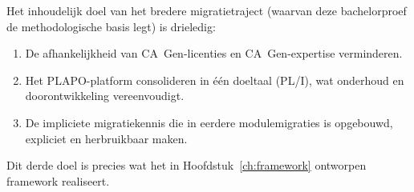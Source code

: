 Het inhoudelijk doel van het bredere migratietraject (waarvan deze bachelorproef de
methodologische basis legt) is drieledig:
\begin{enumerate}
    \item De afhankelijkheid van CA~Gen-licenties en CA~Gen-expertise verminderen.
    \item Het PLAPO-platform consolideren in één doeltaal (PL/I), wat onderhoud en doorontwikkeling
        vereenvoudigt.
    \item De impliciete migratiekennis die in eerdere modulemigraties is opgebouwd, expliciet en
        herbruikbaar maken.
\end{enumerate}
Dit derde doel is precies wat het in Hoofdstuk~\ref{ch:framework} ontworpen framework realiseert.

